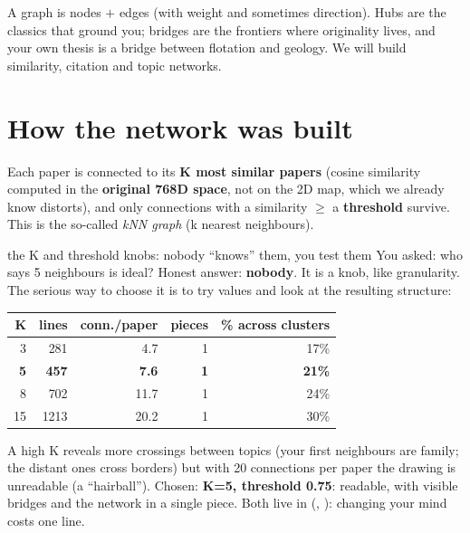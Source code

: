 \documentclass[11pt,a4paper]{article}
\begin{document}
\begin{resumen}
A graph is nodes $+$ edges (with weight and sometimes direction). Hubs are the classics that
ground you; bridges are the frontiers where originality lives, and your own thesis is a bridge
between flotation and geology. We will build similarity, citation and topic networks.
\end{resumen}
\clearpage
{}
{}

\section{How the network was built}

Each paper is connected to its \textbf{K most similar papers} (cosine similarity computed in
the \textbf{original 768D space}, not on the 2D map, which we already know distorts), and only
connections with a similarity $\geq$ a \textbf{threshold} survive. This is the so-called
\emph{kNN graph} (k nearest neighbours).

\begin{concepto}{the K and threshold knobs: nobody ``knows'' them, you test them}
You asked: who says 5 neighbours is ideal? Honest answer: \textbf{nobody}. It is a knob, like
granularity. The serious way to choose it is to try values and look at the resulting
structure:

\begin{center}
\begin{tabular}{rrrrr}
\textbf{K} & \textbf{lines} & \textbf{conn./paper} & \textbf{pieces} & \textbf{\% across clusters} \\
\hline
3 & 281 & 4.7 & 1 & 17\% \\
\textbf{5} & \textbf{457} & \textbf{7.6} & \textbf{1} & \textbf{21\%} \\
8 & 702 & 11.7 & 1 & 24\% \\
15 & 1213 & 20.2 & 1 & 30\% \\
\end{tabular}
\end{center}

A high K reveals more crossings between topics (your first neighbours are family; the distant
ones cross borders) but with 20 connections per paper the drawing is unreadable (a
``hairball''). Chosen: \textbf{K=5, threshold 0.75}: readable, with visible bridges and the
network in a single piece. Both live in  (,
): changing your mind costs one line.
\end{concepto}
\end{document}
